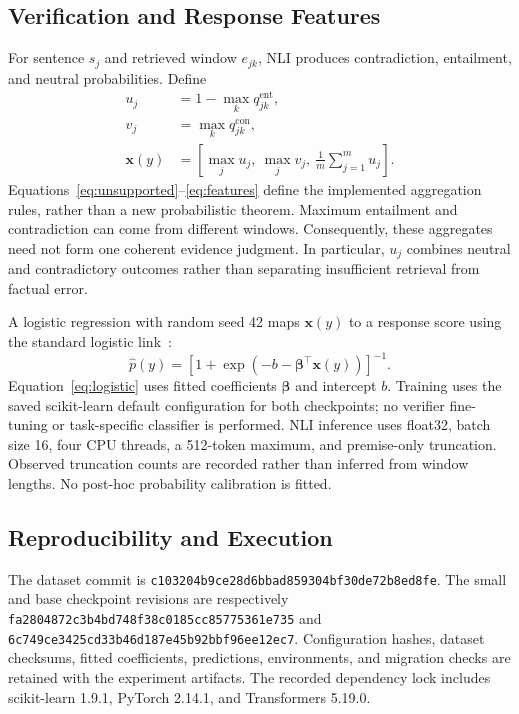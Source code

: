 \documentclass[conference,a4paper]{IEEEtran}
\begin{document}
\subsection{Verification and Response Features}
For sentence $s_j$ and retrieved window $e_{jk}$, NLI produces contradiction, entailment, and neutral probabilities. Define
\begin{align}
u_j &= 1-\max_k q_{jk}^{\mathrm{ent}},\label{eq:unsupported}\\
v_j &= \max_k q_{jk}^{\mathrm{con}},\label{eq:contradiction}\\
\mathbf{x}(y)&=\left[\max_j u_j,\ \max_j v_j,\ \frac{1}{m}\sum_{j=1}^{m}u_j\right].\label{eq:features}
\end{align}
Equations~\eqref{eq:unsupported}--\eqref{eq:features} define the implemented aggregation rules, rather than a new probabilistic theorem. Maximum entailment and contradiction can come from different windows. Consequently, these aggregates need not form one coherent evidence judgment. In particular, $u_j$ combines neutral and contradictory outcomes rather than separating insufficient retrieval from factual error.

A logistic regression with random seed 42 maps $\mathbf{x}(y)$ to a response score using the standard logistic link~\cite{sklearnlr}:
\begin{equation}
\widehat{p}(y)=\left[1+\exp\left(-b-\boldsymbol{\beta}^{\top}\mathbf{x}(y)\right)\right]^{-1}.\label{eq:logistic}
\end{equation}
Equation~\eqref{eq:logistic} uses fitted coefficients $\boldsymbol{\beta}$ and intercept $b$. Training uses the saved scikit-learn default configuration for both checkpoints; no verifier fine-tuning or task-specific classifier is performed. NLI inference uses float32, batch size 16, four CPU threads, a 512-token maximum, and premise-only truncation. Observed truncation counts are recorded rather than inferred from window lengths. No post-hoc probability calibration is fitted.

\subsection{Reproducibility and Execution}
The dataset commit is \texttt{c103204b9ce28d6bbad859304bf30de72b8ed8fe}. The small and base checkpoint revisions are respectively \texttt{fa2804872c3b4bd748f38c0185cc85775361e735} and \texttt{6c749ce3425cd33b46d187e45b92bbf96ee12ec7}. Configuration hashes, dataset checksums, fitted coefficients, predictions, environments, and migration checks are retained with the experiment artifacts. The recorded dependency lock includes scikit-learn 1.9.1, PyTorch 2.14.1, and Transformers 5.19.0.
\end{document}
